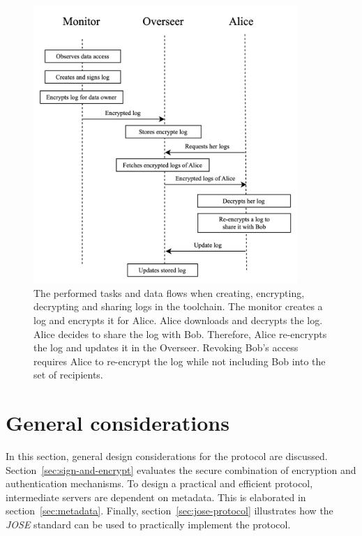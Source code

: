 \documentclass[../main.tex]{subfiles}
\begin{document}
\begin{figure}[h!]
    \includegraphics[width=10cm]{../img/05/overview.jpg}
    \centering
    \caption{
        The performed tasks and data flows when creating, encrypting, decrypting and sharing logs in the toolchain.
        The monitor creates a log and encrypts it for Alice.
        Alice downloads and decrypts the log.
        Alice decides to share the log with Bob.
        Therefore, Alice re-encrypts the log and updates it in the Overseer.
        Revoking Bob's access requires Alice to re-encrypt the log while not including Bob into the set of recipients.
    }
    \label{fig:protocol-overview}
\end{figure}

\section{General considerations}
\label{sec:protocol-considerations}
In this section, general design considerations for the protocol are discussed.
Section~\ref{sec:sign-and-encrypt} evaluates the secure combination of encryption and authentication mechanisms.
To design a practical and efficient protocol, intermediate servers are dependent on metadata.
This is elaborated in section~\ref{sec:metadata}.
Finally, section~\ref{sec:jose-protocol} illustrates how the \emph{JOSE} standard can be used to practically implement the protocol.
\end{document}
